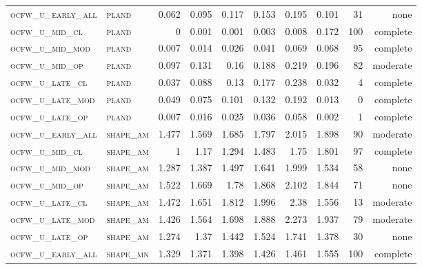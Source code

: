 \begin{landscape}
\begin{center}
\begin{footnotesize}
\begin{longtable}{llrrrrr|rrr}
\textsc{ocfw\_u\_early\_all} & \textsc{pland     }    & 0.062    & 0.095    & 0.117    & 0.153    & 0.195    & 0.101    & 31  & none     \\
\textsc{ocfw\_u\_mid\_cl   } & \textsc{pland     }    & 0        & 0.001    & 0.001    & 0.003    & 0.008    & 0.172    & 100 & complete \\
\textsc{ocfw\_u\_mid\_mod  } & \textsc{pland     }    & 0.007    & 0.014    & 0.026    & 0.041    & 0.069    & 0.068    & 95  & complete \\
\textsc{ocfw\_u\_mid\_op   } & \textsc{pland     }    & 0.097    & 0.131    & 0.16     & 0.188    & 0.219    & 0.196    & 82  & moderate \\
\textsc{ocfw\_u\_late\_cl  } & \textsc{pland     }    & 0.037    & 0.088    & 0.13     & 0.177    & 0.238    & 0.032    & 4   & complete \\
\textsc{ocfw\_u\_late\_mod } & \textsc{pland     }    & 0.049    & 0.075    & 0.101    & 0.132    & 0.192    & 0.013    & 0   & complete \\
\textsc{ocfw\_u\_late\_op  } & \textsc{pland     }    & 0.007    & 0.016    & 0.025    & 0.036    & 0.058    & 0.002    & 1   & complete \\
\textsc{ocfw\_u\_early\_all} & \textsc{shape\_am }    & 1.477    & 1.569    & 1.685    & 1.797    & 2.015    & 1.898    & 90  & moderate \\
\textsc{ocfw\_u\_mid\_cl   } & \textsc{shape\_am }    & 1        & 1.17     & 1.294    & 1.483    & 1.75     & 1.801    & 97  & complete \\
\textsc{ocfw\_u\_mid\_mod  } & \textsc{shape\_am }    & 1.287    & 1.387    & 1.497    & 1.641    & 1.999    & 1.534    & 58  & none     \\
\textsc{ocfw\_u\_mid\_op   } & \textsc{shape\_am }    & 1.522    & 1.669    & 1.78     & 1.868    & 2.102    & 1.844    & 71  & none     \\
\textsc{ocfw\_u\_late\_cl  } & \textsc{shape\_am }    & 1.472    & 1.651    & 1.812    & 1.996    & 2.38     & 1.556    & 13  & moderate \\
\textsc{ocfw\_u\_late\_mod } & \textsc{shape\_am }    & 1.426    & 1.564    & 1.698    & 1.888    & 2.273    & 1.937    & 79  & moderate \\
\textsc{ocfw\_u\_late\_op  } & \textsc{shape\_am }    & 1.274    & 1.37     & 1.442    & 1.524    & 1.741    & 1.378    & 30  & none     \\
\textsc{ocfw\_u\_early\_all} & \textsc{shape\_mn }    & 1.329    & 1.371    & 1.398    & 1.426    & 1.461    & 1.555    & 100 & complete \\

\end{longtable}
\end{footnotesize}
\end{center}
\end{landscape}
